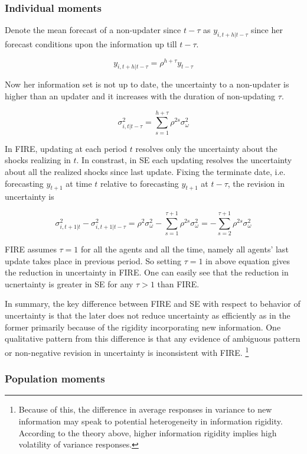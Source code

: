 \documentclass[]{article}
\begin{document}
\subsubsection{Individual moments} 

Denote the mean forecast of a non-updater since $t-\tau$ as $y_{i,t+h|t-\tau}$ since her forecast conditions upon the information up till $t-\tau$.

$$y_{i,t+h|t-\tau} = \rho^{h+\tau} y_{t-\tau}$$

Now her information set is not up to date, the uncertainty to a non-updater is higher than an updater and it increases with the duration of non-updating $\tau$. 

$$\sigma^2_{i,t|t-\tau}= \sum^{h+\tau}_{s=1}\rho^{2s} \sigma^2_{\omega}$$
 
In FIRE, updating at each period $t$ resolves only the uncertainty about the shocks realizing in $t$. In constrast, in SE each updating resolves the uncertainty about all the realized shocks since last update. Fixing the terminate date, i.e. forecasting  $y_{t+1}$ at time $t$ relative to forecasting $y_{t+1}$ at $t-\tau$, the revision in uncertainty is 

$$\sigma^2_{i,t+1|t} - \sigma^2_{i,t+1|t-\tau} = \rho^{2} \sigma^2_{\omega} - \sum^{\tau+1}_{s=1}\rho^{2s} \sigma^2_{\omega} = -\sum^{\tau+1}_{s=2} \rho^{2s}\sigma^2_{\omega}$$

FIRE assumes  $\tau=1$ for all the agents and all the time, namely all agents' last update takes place in previous period. So setting $\tau =1$ in above equation gives the reduction in uncertainty in FIRE. One can easily see that the reduction in ucnertainty is greater in SE for any $\tau>1$ than FIRE.

In summary, the key difference between FIRE and SE with respect to behavior of uncertainty is that the later does not reduce uncertainty  as efficiently as in the former primarily because of the rigidity incorporating new information.  One qualitative pattern from this difference is that any evidence of ambiguous pattern  or non-negative revision in uncertainty is inconsistent with FIRE. \footnote{Because of this, the difference in average responses in variance to new information may speak to potential heterogeneity in information rigidity. According to the theory above, higher information rigidity implies high volatility of variance responses.  }
 


\subsubsection{Population moments} 
	
\end{document}
